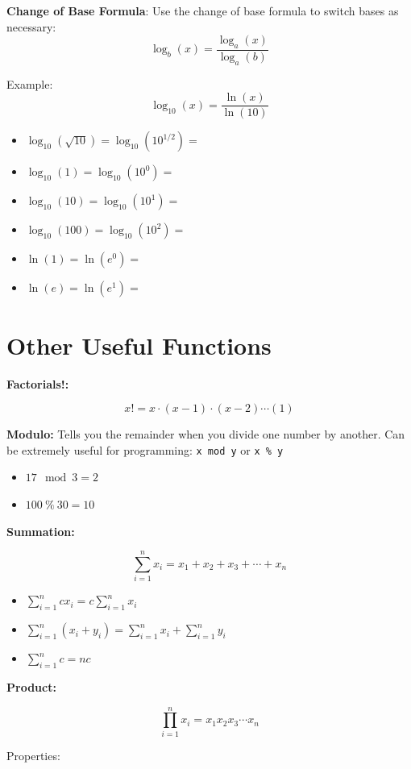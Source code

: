 \documentclass[]{book}
\providecommand{\tightlist}{%
  \setlength{\itemsep}{0pt}\setlength{\parskip}{0pt}}
\theoremstyle{definition}
\theoremstyle{definition}
\theoremstyle{definition}
\theoremstyle{remark}
\begin{document}
\textbf{Change of Base Formula}: Use the change of base formula to
switch bases as necessary: \[\log_b(x) = \frac{\log_a(x)}{\log_a(b)}\]

Example: \[\log_{10}(x) = \frac{\ln(x)}{\ln(10)}\]

\begin{itemize}
\item $\log_{10}(\sqrt{10})=\log_{10}(10^{1/2}) = $
\item $\log_{10}(1)=\log_{10}(10^{0}) = $
\item $\log_{10}(10)=\log_{10}(10^{1}) = $
\item $\log_{10}(100)=\log_{10}(10^{2}) = $
\item $\ln(1)=\ln(e^{0}) = $
\item $\ln(e)=\ln(e^{1}) = $
\end{itemize}

\section{Other Useful Functions}\label{other-useful-functions}

\textbf{Factorials!:}

\[x! = x\cdot (x-1) \cdot (x-2) \cdots (1)\]

\textbf{Modulo:} Tells you the remainder when you divide one number by
another. Can be extremely useful for programming: \texttt{x mod y} or
\texttt{x \% y}

\begin{itemize}
\tightlist
\item
  \(17 \mod 3 = 2\)
\item
  \(100 \ \% \ 30 = 10\)
\end{itemize}

\textbf{Summation:}

\[\sum\limits_{i=1}^n x_i = x_1+x_2+x_3+\cdots+x_n\]

\begin{itemize}
\item $\sum\limits_{i=1}^n c x_i = c \sum\limits_{i=1}^n x_i $
\item $\sum\limits_{i=1}^n (x_i + y_i) =  \sum\limits_{i=1}^n x_i + \sum\limits_{i=1}^n y_i $
\item $\sum\limits_{i=1}^n c = n c $
\end{itemize}

\textbf{Product:}

\[\prod\limits_{i=1}^n x_i = x_1 x_2 x_3 \cdots x_n\]

Properties:
\end{document}
